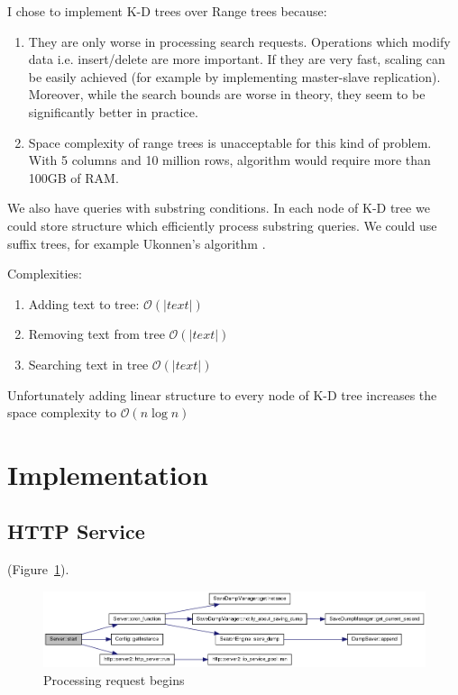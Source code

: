 \documentclass[10pt,a4paper]{article}
\newcommand{\Oh}{\mathcal{O}}
\begin{document}
I chose to implement K-D trees over Range trees because:
\begin{enumerate}
\item They are only worse in processing search requests. Operations which modify data i.e. insert/delete are more important. If they are very fast, scaling can be easily achieved (for example by implementing master-slave replication). Moreover, while the search bounds are worse in theory, they seem to be significantly better in practice.
\item Space complexity of range trees is unacceptable for this kind of problem. With 5 columns and 10 million rows, algorithm would require more than 100GB of RAM.
\end{enumerate}

\bigskip
We also have queries with substring conditions. In each node of K-D tree we could store structure which efficiently process substring queries. We could use suffix trees, for example Ukonnen's algorithm \cite{STUKK} .

Complexities:
\begin{enumerate}
\item Adding text to tree: $\Oh(|text|)$
\item Removing text from tree $\Oh(|text|)$
\item Searching text in tree $\Oh(|text|)$
\end{enumerate}

Unfortunately adding linear structure to every node of K-D tree increases the space complexity to $\Oh(n \log n)$

\section{Implementation}

\subsection{HTTP Service}


 (Figure~\ref{fig:httpservice}).

\begin{figure}
\centering
  \includegraphics[width=16cm]{start}
  \caption{Processing request begins}
  \label{fig:httpservice}
\end{figure}
\end{document}
